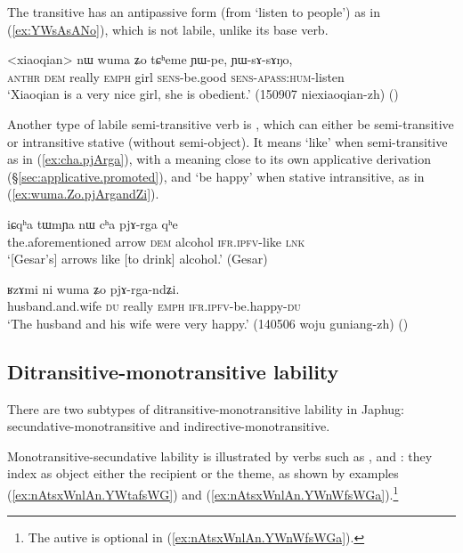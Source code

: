 The transitive  has an antipassive form  (from `listen to people') as in (\ref{ex:YWsAsANo}), which is not labile, unlike its base verb.

\begin{exe}
\ex \label{ex:YWsAsANo}
\gll <xiaoqian> nɯ wuma ʑo tɕʰeme ɲɯ-pe, ɲɯ-sɤ-sɤŋo,  \\
\textsc{anthr} \textsc{dem} really \textsc{emph} girl \textsc{sens}-be.good \textsc{sens}-\textsc{apass}:\textsc{hum}-listen \\
\glt `Xiaoqian is a very nice girl, she is obedient.' (150907 niexiaoqian-zh) ()
\end{exe}  

Another type of labile semi-transitive verb is , which can either be semi-transitive or intransitive stative (without semi-object). It means `like' when semi-transitive as in (\ref{ex:cha.pjArga}), with a meaning close to its own applicative derivation (§\ref{sec:applicative.promoted}), and `be happy' when stative intransitive, as in (\ref{ex:wuma.Zo.pjArgandZi}).

\begin{exe}
\ex \label{ex:cha.pjArga}
\gll iɕqʰa tɯmɲa nɯ cʰa pjɤ-rga qʰe \\
the.aforementioned arrow \textsc{dem} alcohol \textsc{ifr}.\textsc{ipfv}-like \textsc{lnk} \\
\glt `[Gesar's] arrows like [to drink] alcohol.' (Gesar)
\end{exe}

\begin{exe}
\ex \label{ex:wuma.Zo.pjArgandZi}
\gll ʁzɤmi ni wuma ʑo pjɤ-rga-ndʑi. \\
husband.and.wife \textsc{du} really \textsc{emph} \textsc{ifr}.\textsc{ipfv}-be.happy-\textsc{du} \\
\glt `The husband and his wife were very happy.' (140506 woju guniang-zh)
()
\end{exe}

 \subsection{Ditransitive-monotransitive lability} \label{sec:secundative.monotransitive}
There are two subtypes of ditransitive-monotransitive lability in Japhug: secun\-da\-tive-monotransitive and indirective-monotransitive.

Monotransitive-secundative lability is illustrated by verbs such as ,  and : they index as object either the recipient or the theme, as shown by examples (\ref{ex:nAtsxWnlAn.YWtafsWG}) and (\ref{ex:nAtsxWnlAn.YWnWfsWGa}).\footnote{The autive is optional in (\ref{ex:nAtsxWnlAn.YWnWfsWGa}). }

